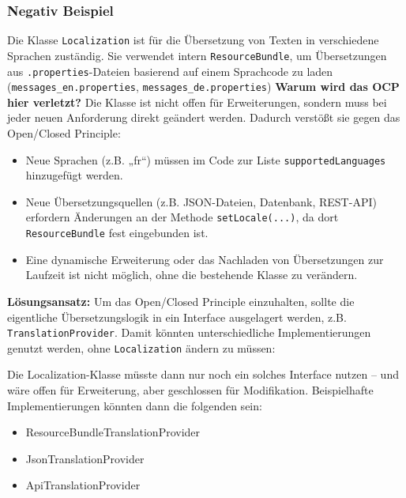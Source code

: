 \subsubsection*{Negativ Beispiel}
Die Klasse \texttt{Localization} ist für die Übersetzung von Texten in verschiedene Sprachen zuständig. Sie verwendet intern \texttt{ResourceBundle}, um Übersetzungen aus \texttt{.properties}-Dateien basierend auf einem Sprachcode zu laden (\texttt{messages\_en.properties}, \texttt{messages\_de.properties})
\newline\newline
\textbf{Warum wird das OCP hier verletzt?}\newline
Die Klasse ist nicht offen für Erweiterungen, sondern muss bei jeder neuen Anforderung direkt geändert werden. Dadurch verstößt sie gegen das Open/Closed Principle:
\begin{itemize}
    \item Neue Sprachen (z.B. „fr“) müssen im Code zur Liste \texttt{supportedLanguages} hinzugefügt werden.
    \item Neue Übersetzungsquellen (z.B. JSON-Dateien, Datenbank, REST-API) erfordern Änderungen an der Methode \texttt{setLocale(...)}, da dort \texttt{ResourceBundle} fest eingebunden ist.
    \item Eine dynamische Erweiterung oder das Nachladen von Übersetzungen zur Laufzeit ist nicht möglich, ohne die bestehende Klasse zu verändern.
\end{itemize}
\newline
\textbf{Lösungsansatz:}\newline
Um das Open/Closed Principle einzuhalten, sollte die eigentliche Übersetzungslogik in ein Interface ausgelagert werden, z.B. \texttt{TranslationProvider}. Damit könnten unterschiedliche Implementierungen genutzt werden, ohne \texttt{Localization} ändern zu müssen:
\newline

Die Localization-Klasse müsste dann nur noch ein solches Interface nutzen – und wäre offen für Erweiterung, aber geschlossen für Modifikation. Beispielhafte Implementierungen könnten dann die folgenden sein: \newline
\begin{itemize}
    \item ResourceBundleTranslationProvider
    \item JsonTranslationProvider
    \item ApiTranslationProvider
\end{itemize}
